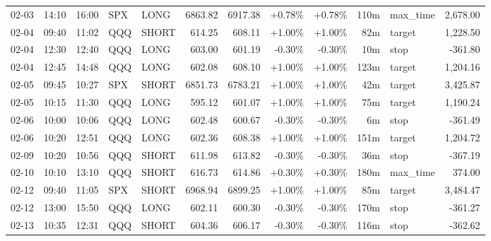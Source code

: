 \documentclass[11pt,a4paper,twoside]{article}
\begin{document}
\begin{center}
\begin{longtable}{>{\color{txtmain}}l l l l l r r r r r >{\color{txtmain}}l r}
02-03 & 14:10 & 16:00 & SPX & LONG & 6863.82 & 6917.38 & \textcolor{wingreen}{+0.78\%} & \textcolor{wingreen}{+0.78\%} & 110m & max\_time & \textcolor{wingreen}{2,678.00} \\
02-04 & 09:40 & 11:02 & QQQ & SHORT & 614.25 & 608.11 & \textcolor{wingreen}{+1.00\%} & \textcolor{wingreen}{+1.00\%} & 82m & target & \textcolor{wingreen}{1,228.50} \\
02-04 & 12:30 & 12:40 & QQQ & LONG & 603.00 & 601.19 & \textcolor{lossred}{-0.30\%} & \textcolor{lossred}{-0.30\%} & 10m & stop & \textcolor{lossred}{-361.80} \\
02-04 & 12:45 & 14:48 & QQQ & LONG & 602.08 & 608.10 & \textcolor{wingreen}{+1.00\%} & \textcolor{wingreen}{+1.00\%} & 123m & target & \textcolor{wingreen}{1,204.16} \\
02-05 & 09:45 & 10:27 & SPX & SHORT & 6851.73 & 6783.21 & \textcolor{wingreen}{+1.00\%} & \textcolor{wingreen}{+1.00\%} & 42m & target & \textcolor{wingreen}{3,425.87} \\
02-05 & 10:15 & 11:30 & QQQ & LONG & 595.12 & 601.07 & \textcolor{wingreen}{+1.00\%} & \textcolor{wingreen}{+1.00\%} & 75m & target & \textcolor{wingreen}{1,190.24} \\
02-06 & 10:00 & 10:06 & QQQ & LONG & 602.48 & 600.67 & \textcolor{lossred}{-0.30\%} & \textcolor{lossred}{-0.30\%} & 6m & stop & \textcolor{lossred}{-361.49} \\
02-06 & 10:20 & 12:51 & QQQ & LONG & 602.36 & 608.38 & \textcolor{wingreen}{+1.00\%} & \textcolor{wingreen}{+1.00\%} & 151m & target & \textcolor{wingreen}{1,204.72} \\
02-09 & 10:20 & 10:56 & QQQ & SHORT & 611.98 & 613.82 & \textcolor{lossred}{-0.30\%} & \textcolor{lossred}{-0.30\%} & 36m & stop & \textcolor{lossred}{-367.19} \\
02-10 & 10:10 & 13:10 & QQQ & SHORT & 616.73 & 614.86 & \textcolor{wingreen}{+0.30\%} & \textcolor{wingreen}{+0.30\%} & 180m & max\_time & \textcolor{wingreen}{374.00} \\
02-12 & 09:40 & 11:05 & SPX & SHORT & 6968.94 & 6899.25 & \textcolor{wingreen}{+1.00\%} & \textcolor{wingreen}{+1.00\%} & 85m & target & \textcolor{wingreen}{3,484.47} \\
02-12 & 13:00 & 15:50 & QQQ & LONG & 602.11 & 600.30 & \textcolor{lossred}{-0.30\%} & \textcolor{lossred}{-0.30\%} & 170m & stop & \textcolor{lossred}{-361.27} \\
02-13 & 10:35 & 12:31 & QQQ & SHORT & 604.36 & 606.17 & \textcolor{lossred}{-0.30\%} & \textcolor{lossred}{-0.30\%} & 116m & stop & \textcolor{lossred}{-362.62} \\

\end{longtable}
\end{center}
\end{document}
